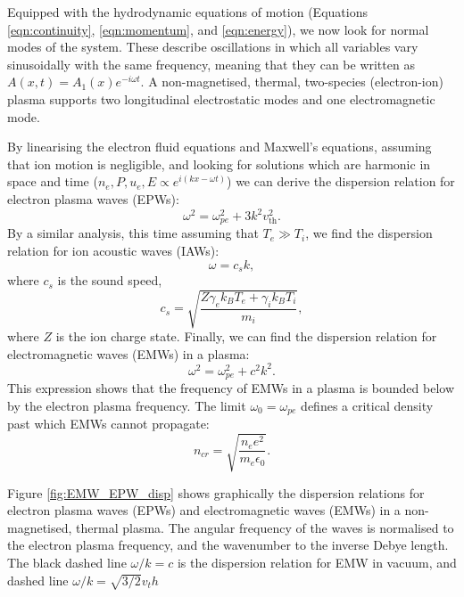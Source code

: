 Equipped with the hydrodynamic equations of motion (Equations \ref{eqn:continuity}, \ref{eqn:momentum}, and \ref{eqn:energy}), we now look for normal modes of the system. These describe oscillations in which all variables vary sinusoidally with the same frequency, meaning that they can be written as $A(x,t) = A_1(x)e^{-i\omega t}$. A non-magnetised, thermal, two-species (electron-ion) plasma supports two longitudinal electrostatic modes and one electromagnetic mode. 

By linearising the electron fluid equations and Maxwell's equations, assuming that ion motion is negligible, and looking for solutions which are harmonic in space and time ($n_e,P,u_e,E \propto  e^{i(kx -\omega t)}$)  we can derive the dispersion relation for electron plasma waves (\acrshort{EPW}s):
\begin{equation}\label{eqn:EPW}
	\omega^{2}=\omega_{p e}^{2}+3 k^{2} v_{\text{th}}^{2}. 
\end{equation} By a similar analysis, this time assuming that $T_e \gg T_i$, we find the dispersion relation for ion acoustic waves (\acrshort{IAW}s):
\begin{equation}\label{eqn:IAW}
 \omega =  c_{s} k,
\end{equation} where $c_{s}$ is the sound speed,
\begin{equation}
c_s = \sqrt{\frac{Z\gamma_ek_BT_e + \gamma_ik_BT_i}{m_i}},
\end{equation} where $Z$ is the ion charge state. Finally, we can find the dispersion relation for electromagnetic waves (\acrshort{EMW}s) in a plasma:
\begin{equation}\label{eqn:EMW}
 \omega^{2}=\omega_{p e}^{2}+c^2k^{2}.
\end{equation} This expression shows that the frequency of EMWs in a plasma is bounded below by the electron plasma frequency. The limit $\omega_0=\omega_{pe}$ defines a critical density past which EMWs cannot propagate:
\begin{equation}\label{eqn:ncrit}
 n_{cr} = \sqrt{\frac{n_e e^2}{m_e\epsilon_0}}.
\end{equation} 

Figure \ref{fig:EMW_EPW_disp} shows graphically the dispersion relations for electron plasma waves (\acrshort{EPW}s) and electromagnetic waves (\acrshort{EMW}s) in a non-magnetised, thermal plasma. The angular frequency of the waves is normalised to the electron plasma frequency, and the wavenumber to the inverse Debye length. The black dashed line $\omega / k = c$ is the dispersion relation for \acrshort{EMW} in vacuum, and dashed line $\omega / k = \sqrt{3/2}v_th$


